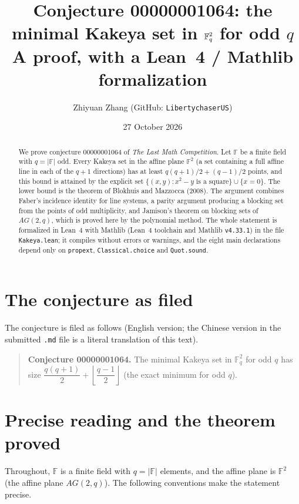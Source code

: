 \documentclass[11pt,a4paper]{article}
\title{Conjecture 00000001064: the minimal Kakeya set in $\F_q^2$ for odd $q$\\
\large A proof, with a Lean~4 / Mathlib formalization}
\author{Zhiyuan Zhang (GitHub: \texttt{LibertychaserUS})}
\date{27 October 2026}
\theoremstyle{definition}
\theoremstyle{remark}
\newcommand{\F}{\mathbb{F}}
\begin{document}
\maketitle

\begin{abstract}
We prove conjecture 00000001064 of \emph{The Last Math Competition}. Let $\F$ be a finite field
with $q=|\F|$ odd. Every Kakeya set in the affine plane $\F^2$ (a set containing a full affine line
in each of the $q+1$ directions) has at least $q(q+1)/2+(q-1)/2$ points, and this bound is attained
by the explicit set $\{(x,y): x^2-y \text{ is a square}\}\cup\{x=0\}$. The lower bound is the
theorem of Blokhuis and Mazzocca (2008). The argument combines Faber's incidence identity for line
systems, a parity argument producing a blocking set from the points of odd multiplicity, and
Jamison's theorem on blocking sets of $AG(2,q)$, which is proved here by the polynomial method.
The whole statement is formalized in Lean~4 with Mathlib (Lean~4 toolchain and Mathlib \texttt{v4.33.1})
in the file \texttt{Kakeya.lean}; it compiles without errors or warnings, and the eight main
declarations depend only on \texttt{propext}, \texttt{Classical.choice} and \texttt{Quot.sound}.
\end{abstract}

\tableofcontents

\section{The conjecture as filed}

The conjecture is filed as follows (English version; the Chinese version in the submitted
\texttt{.md} file is a literal translation of this text).

\begin{quote}
\textbf{Conjecture 00000001064.} The minimal Kakeya set in $\F_q^2$ for odd $q$ has size
$\dfrac{q(q+1)}{2}+\left\lfloor\dfrac{q-1}{2}\right\rfloor$ (the exact minimum for odd $q$).
\end{quote}

\section{Precise reading and the theorem proved}

Throughout, $\F$ is a finite field with $q=|\F|$ elements, and the affine plane is $\F^2$ (the
affine plane $AG(2,q)$). The following conventions make the statement precise.
\end{document}
